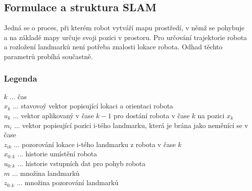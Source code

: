 \documentclass[11pt]{article}
\begin{document}
\subsection{Formulace a struktura SLAM} 
Jedná se o proces, při kterém robot vytváří mapu prostředí, v němž se pohybuje a na základě mapy určuje svoji pozici v prostoru. Pro určování trajektorie robota a rozložení landmarků není potřeba znalosti lokace robota. Odhad těchto parametrů probíhá součastně. 

\subsubsection{Legenda}
$k$ ... čas\\
$x_k$ ... stavovoý vektor popisující lokaci a orientaci robota\\ 
$u_k$ ... vektor aplikovaný v čase $k-1$ pro dostání robota v čase $k$ na pozici $x_k$\\
$m_i$ ... vektor popisující pozici i-tého landmarku, která je brána jako neměnící se v čase\\
$z_{ik}$ ... pozorování lokace i-tého landmarku z robota v čase $k$\\
$x_{0:k}$ ... historie umístění robota\\
$u_{0:k}$ ... historie vstupních dat pro pohyb robota\\
$m$ ... množina landmarků\\
$z_{0:k}$ ... množina pozorování landmarků
\end{document}
